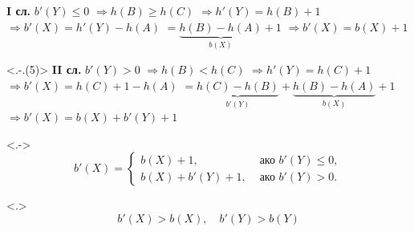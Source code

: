 \documentclass{beamer}
\begin{document}
\begin{frame}[label=rotright]
\begin{overlayarea}{\textwidth}{10em}
\begin{onlyenv}
      \textbf{I сл. }$b'(Y) \leq 0$
      \onslide<+-> $\Rightarrow h(B) \geq h(C)$
      \onslide<+-> $\Rightarrow h'(Y) = h(B) + 1$
      \onslide<+-> $\Rightarrow b'(X) = h'(Y) - h(A)$
      \onslide<+-> $ = \underbrace{h(B) - h(A)}_{b(X)} + 1$
      \onslide<+-> $\Rightarrow b'(X) = b(X) + 1$
    \end{onlyenv}
    \onslide<+->
    \begin{onlyenv}<.-.(5)>
      \textbf{II сл.} $b'(Y) > 0$
      \onslide<+-> $\Rightarrow h(B) < h(C)$
      \onslide<+-> $\Rightarrow h'(Y) = h(C) + 1$
      \onslide<+-> $\Rightarrow b'(X) = h(C) + 1 - h(A)$
      \onslide<+-> $ = \underbrace{h(C) - h(B)}_{b'(Y)} + \underbrace{h(B) - h(A)}_{b(X)} + 1$
      \onslide<+-> $\Rightarrow b'(X) = b(X) + b'(Y) + 1$
    \end{onlyenv}
    \onslide<+->
    \begin{onlyenv}<.->
      \begin{equation*}
        b'(X) =
        \begin{cases}
          b(X) + 1,&\text{ ако }b'(Y) \leq 0,\\
          b(X) + b'(Y) + 1,&\text{ ако }b'(Y) > 0.
        \end{cases}
      \end{equation*}
    \end{onlyenv}
    \onslide<+->
    \begin{onlyenv}<.>
      \vspace{-0.5em}
      \begin{equation*}
        b'(X) > b(X), \quad b'(Y) > b(Y)
      \end{equation*}
    \end{onlyenv}
  \end{overlayarea}
\end{frame}
\end{document}
